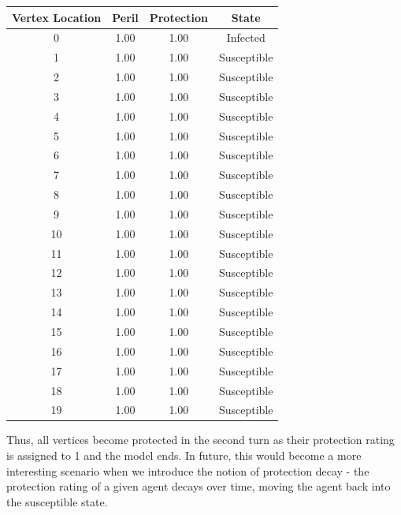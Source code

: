 \documentclass[results.tex]{subfiles}
\begin{document}
\begin{center}
  \begin{tabular}{| c || c | c | c |}
  \hline
  Vertex Location & Peril & Protection & State\\
  \hline\hline
  0 & 1.00 & 1.00 & Infected \\
  \hline
  1 & 1.00 & 1.00 & Susceptible \\
  \hline
  2 & 1.00 & 1.00 & Susceptible \\
  \hline
  3 & 1.00 & 1.00 & Susceptible \\
  \hline
  4 & 1.00 & 1.00 & Susceptible \\
  \hline
  5 & 1.00 & 1.00 & Susceptible \\
  \hline
  6 & 1.00 & 1.00 & Susceptible \\
  \hline
  7 & 1.00 & 1.00 & Susceptible \\
  \hline
  8 & 1.00 & 1.00 & Susceptible \\
  \hline
  9 & 1.00 & 1.00 & Susceptible \\
  \hline
  10 & 1.00 & 1.00 & Susceptible \\
  \hline
  11 & 1.00 & 1.00 & Susceptible \\
  \hline
  12 & 1.00 & 1.00 & Susceptible \\
  \hline
  13 & 1.00 & 1.00 & Susceptible \\
  \hline
  14 & 1.00 & 1.00 & Susceptible \\
  \hline
  15 & 1.00 & 1.00 & Susceptible \\
  \hline
  16 & 1.00 & 1.00 & Susceptible \\
  \hline
  17 & 1.00 & 1.00 & Susceptible \\
  \hline
  18 & 1.00 & 1.00 & Susceptible \\
  \hline
  19  & 1.00 & 1.00 & Susceptible \\
  \hline
  \end{tabular}
\end{center}

Thus, all vertices become protected in the second turn as their protection rating is assigned to 1 and the model ends. In future, this would become a more interesting scenario when we introduce the notion of protection decay - the protection rating of a given agent decays over time, moving the agent back into the susceptible state.
\end{document}

